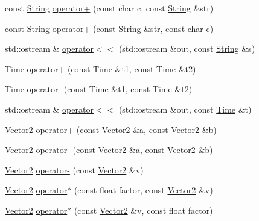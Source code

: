 \begin{DoxyCompactItemize}
\item 
const \hyperlink{classprism_1_1_string}{String} \hyperlink{namespaceprism_aa0fce6a8b93050fcb6db327e68b701e3}{operator+} (const char c, const \hyperlink{classprism_1_1_string}{String} \&str)
\item 
const \hyperlink{classprism_1_1_string}{String} \hyperlink{namespaceprism_a8ae68ccc6eb3a47a748671c1a7af88ca}{operator+} (const \hyperlink{classprism_1_1_string}{String} \&str, const char c)
\item 
std\+::ostream \& \hyperlink{namespaceprism_a0a166bbf645cc854542cc0fc50324670}{operator$<$$<$} (std\+::ostream \&out, const \hyperlink{classprism_1_1_string}{String} \&s)
\item 
\hyperlink{classprism_1_1_time}{Time} \hyperlink{namespaceprism_afd483f03b731881b25da5612b1213e5f}{operator+} (const \hyperlink{classprism_1_1_time}{Time} \&t1, const \hyperlink{classprism_1_1_time}{Time} \&t2)
\item 
\hyperlink{classprism_1_1_time}{Time} \hyperlink{namespaceprism_aa18009df22007fbbde08ab44b16a9a31}{operator-\/} (const \hyperlink{classprism_1_1_time}{Time} \&t1, const \hyperlink{classprism_1_1_time}{Time} \&t2)
\item 
std\+::ostream \& \hyperlink{namespaceprism_a7c24ead13d51c13dcadde1b6df4a4967}{operator$<$$<$} (std\+::ostream \&out, const \hyperlink{classprism_1_1_time}{Time} \&t)
\item 
\hyperlink{classprism_1_1_vector2}{Vector2} \hyperlink{namespaceprism_ae482804c32b466401a9ecdf26bc1e6de}{operator+} (const \hyperlink{classprism_1_1_vector2}{Vector2} \&a, const \hyperlink{classprism_1_1_vector2}{Vector2} \&b)
\item 
\hyperlink{classprism_1_1_vector2}{Vector2} \hyperlink{namespaceprism_a86359a88dc5245847de48575a1f969e8}{operator-\/} (const \hyperlink{classprism_1_1_vector2}{Vector2} \&a, const \hyperlink{classprism_1_1_vector2}{Vector2} \&b)
\item 
\hyperlink{classprism_1_1_vector2}{Vector2} \hyperlink{namespaceprism_a124f1081b3a9bbc441dac9927f8a0fc5}{operator-\/} (const \hyperlink{classprism_1_1_vector2}{Vector2} \&v)
\item 
\hyperlink{classprism_1_1_vector2}{Vector2} \hyperlink{namespaceprism_a6528ec4496096e8ccde186bb01fbeed3}{operator$\ast$} (const float factor, const \hyperlink{classprism_1_1_vector2}{Vector2} \&v)
\item 
\hyperlink{classprism_1_1_vector2}{Vector2} \hyperlink{namespaceprism_a1de3bc1dbc3fd33f26d580bce3520854}{operator$\ast$} (const \hyperlink{classprism_1_1_vector2}{Vector2} \&v, const float factor)

\end{DoxyCompactItemize}
